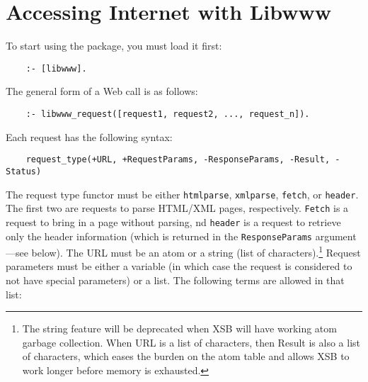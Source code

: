 \section{Accessing Internet with Libwww}

To start using the package, you must load it first:
\begin{verbatim}
    :- [libwww].  
\end{verbatim}

The general form of a Web call is as follows:

\begin{verbatim}
    :- libwww_request([request1, request2, ..., request_n]).  
\end{verbatim}
Each request has the following syntax:
\begin{verbatim}
    request_type(+URL, +RequestParams, -ResponseParams, -Result, -Status)
\end{verbatim}
The request type functor must be either {\tt htmlparse}, {\tt xmlparse},
{\tt fetch}, or {\tt header}. The first two are requests to parse HTML/XML
pages, respectively. {\tt Fetch} is a request to bring in a page without
parsing, nd {\tt header} is a request to retrieve only the header
information (which is returned in the {\tt ResponseParams} argument---see
below).
The URL must be an atom or a string (list of characters).\footnote{
  The string feature will be deprecated when XSB will have working atom
  garbage collection. When URL is a list of characters, then Result is also
  a list of characters, which eases the burden on the atom table and allows
  XSB to work longer before memory is exhausted.
  }
Request parameters must be either a variable (in which case the request is
considered to not have special parameters) or a list. The following terms
are allowed in that list:
